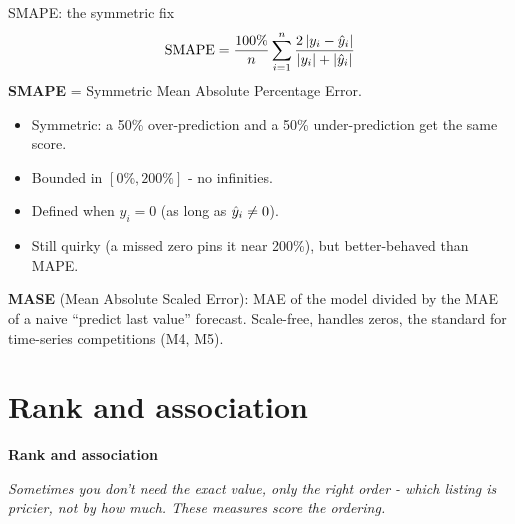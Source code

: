 \documentclass[aspectratio=169]{beamer}
\newcommand{\sectiontransition}[2]{%
  \begin{frame}[plain]
    \centering
    \vfill
    {\color{armblue}\Large\textbf{#1}}\\[14pt]
    \begin{minipage}{0.78\textwidth}\centering\itshape #2\end{minipage}
    \vfill
  \end{frame}%
}
\begin{document}
\begin{frame}{SMAPE: the symmetric fix}
  \[
    \text{SMAPE} = \frac{100\%}{n} \sum_{i=1}^n \frac{2\,|y_i - \hat{y}_i|}{|y_i| + |\hat{y}_i|}
  \]
  \textbf{SMAPE} = Symmetric Mean Absolute Percentage Error.
  \vfill
  \begin{itemize}
    \item Symmetric: a 50\% over-prediction and a 50\% under-prediction get the same score.
    \item Bounded in $[0\%, 200\%]$ - no infinities.
    \item Defined when $y_i = 0$ (as long as $\hat{y}_i \neq 0$).
    \item Still quirky (a missed zero pins it near 200\%), but better-behaved than MAPE.
  \end{itemize}
  \vfill
  \footnotesize \textbf{MASE} (Mean Absolute Scaled Error): MAE of the model divided by the MAE of a naive ``predict last value'' forecast. Scale-free, handles zeros, the standard for time-series competitions (M4, M5).
\end{frame}

\section{Rank and association}
\sectiontransition{Rank and association}{Sometimes you don't need the exact value, only the right order - which listing is pricier, not by how much. These measures score the ordering.}
\end{document}
